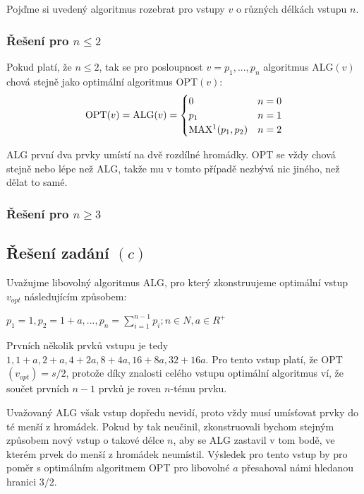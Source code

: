 \documentclass[a4paper, 12pt]{article}
\begin{document}
  Pojďme si uvedený algoritmus rozebrat pro vstupy $v$ o různých délkách vstupu $n$.

  \subsubsection{Řešení pro $n \le 2$}
  Pokud platí, že $n \le 2$, tak se pro posloupnost $v=p_1,...,p_n$ algoritmus ALG$(v)$ chová stejně jako optimální algoritmus OPT$(v)$:
  \newpage
  \begin{equation*}
      \text{OPT}(v)=\text{ALG}(v)= \begin{cases}
        0 & n=0
        \\
        p_1 & n=1
        \\
        \text{MAX\footnotemark}(p_1, p_2) & n=2
      \end{cases}
  \end{equation*}

  ALG první dva prvky umístí na dvě rozdílné hromádky. OPT se vždy chová stejně nebo lépe než ALG, takže mu v tomto případě nezbývá nic jiného, než dělat to samé.

  \subsubsection{Řešení pro $n \ge 3$}

  \subsection{Řešení zadání $(c)$}
  Uvažujme libovolný algoritmus ALG, pro který zkonstruujeme optimální vstup $v_{opt}$ následujícím způsobem:
  \begin{center}
    $p_1=1, p_2=1+a,..., p_n=\sum\limits_{i=1}^{n-1} p_i; n \in N, a \in R^+$
  \end{center}

  Prvních několik prvků vstupu je tedy $1, 1+a, 2+a, 4+2a, 8+4a, 16+8a, 32+16a$. Pro tento vstup platí, že OPT$(v_{opt})=s/2$, protože díky znalosti celého vstupu optimální algoritmus ví, že součet prvních $n-1$ prvků je roven $n$-tému prvku.

  Uvažovaný ALG však vstup dopředu nevidí, proto vždy musí umísťovat prvky do té menší z hromádek. Pokud by tak neučinil, zkonstruovali bychom stejným způsobem nový vstup o takové délce $n$, aby se ALG zastavil v tom bodě, ve kterém prvek do menší z hromádek neumístil. Výsledek pro tento vstup by pro poměr s optimálním algoritmem OPT pro libovolné $a$ přesahoval námi hledanou hranici $3/2$.
\end{document}
